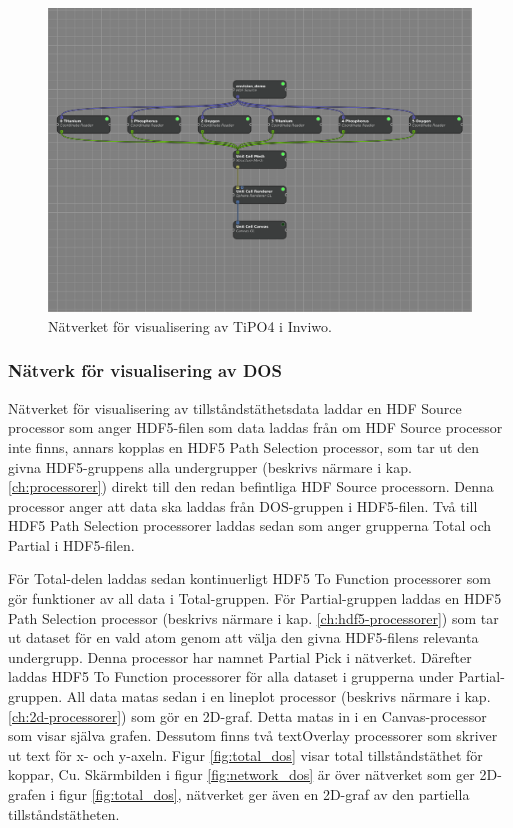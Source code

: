 \documentclass[a4paper,12pt]{article}
\begin{document}
\begin{figure}[H]
    \centering
    \includegraphics[scale=0.30]{screenshot_enhetscellnatverk_TiPO4.png}
    \caption{Nätverket för visualisering av TiPO4 i Inviwo.}
    \label{fig:enhetscellnatverk}
\end{figure}

\subsubsection{Nätverk för visualisering av DOS}
Nätverket för visualisering av tillståndstäthetsdata laddar en HDF Source processor som anger HDF5-filen som data laddas från om HDF Source processor inte finns, annars kopplas
en HDF5 Path Selection processor, som tar ut den givna HDF5-gruppens alla undergrupper (beskrivs närmare i kap. \ref{ch:processorer}) direkt till den redan befintliga HDF Source processorn. Denna processor anger att data ska laddas från DOS-gruppen i HDF5-filen. Två till HDF5 Path Selection processorer laddas sedan som anger grupperna Total och Partial i HDF5-filen.  

För Total-delen laddas sedan kontinuerligt HDF5 To Function processorer som gör funktioner av all 
data i Total-gruppen. För Partial-gruppen laddas en HDF5 Path Selection processor (beskrivs närmare i kap. \ref{ch:hdf5-processorer}) som tar ut dataset för en vald atom genom att välja den givna HDF5-filens relevanta undergrupp. Denna processor har namnet Partial Pick i nätverket. Därefter laddas HDF5 To Function
processorer för alla dataset i 
grupperna under Partial-gruppen. All data matas sedan i en
lineplot processor (beskrivs närmare i kap. \ref{ch:2d-processorer}) som gör en 2D-graf. Detta matas in i en Canvas-processor som visar själva grafen. Dessutom finns två textOverlay processorer som skriver ut text för x- och y-axeln. Figur \ref{fig:total_dos} visar total tillståndstäthet för koppar, Cu. Skärmbilden i figur \ref{fig:network_dos} är över nätverket som ger 2D-grafen i figur \ref{fig:total_dos}, nätverket ger även en 2D-graf av den partiella tillståndstätheten.
\end{document}
